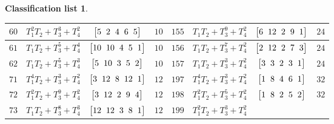 \documentclass[10pt,a4paper]{amsart}
\theoremstyle{definition}
\newtheorem{class-list}[thm]{Classification list}
\numberwithin{equation}{section}
\begin{document}
\begin{class-list}
\begin{table}[t!]
\begin{tabu}{c|c|c|c||c|c|c|c}
\\
\hline
${60}$&${T_{1}^{2}T_{2}+T_{3}^{3}+T_{4}^{2}}$
&$\arraycolsep=1mm\begin{bmatrix}{5} & {2} & {4} & {6} & {5}\end{bmatrix}$&${10}$
&${155}$&${T_{1}T_{2}+T_{3}^{9}+T_{4}^{2}}$
&$\arraycolsep=1mm\begin{bmatrix}{6} & {12} & {2} & {9} & {1}\end{bmatrix}$&${24}$
\\
\hline
${61}$&${T_{1}T_{2}+T_{3}^{5}+T_{4}^{4}}$
&$\arraycolsep=1mm\begin{bmatrix}{10} & {10} & {4} & {5} & {1}\end{bmatrix}$&${10}$
&${156}$&${T_{1}T_{2}+T_{3}^{7}+T_{4}^{2}}$
&$\arraycolsep=1mm\begin{bmatrix}{2} & {12} & {2} & {7} & {3}\end{bmatrix}$&${24}$
\\
\hline
${62}$&${T_{1}T_{2}+T_{3}^{5}+T_{4}^{3}}$
&$\arraycolsep=1mm\begin{bmatrix}{5} & {10} & {3} & {5} & {2}\end{bmatrix}$&${10}$
&${157}$&${T_{1}T_{2}+T_{3}^{3}+T_{4}^{2}}$
&$\arraycolsep=1mm\begin{bmatrix}{3} & {3} & {2} & {3} & {1}\end{bmatrix}$&${24}$
\\
\hline
${71}$&${T_{1}^{4}T_{2}+T_{3}^{3}+T_{4}^{2}}$
&$\arraycolsep=1mm\begin{bmatrix}{3} & {12} & {8} & {12} & {1}\end{bmatrix}$&${12}$
&${197}$&${T_{1}^{4}T_{2}+T_{3}^{3}+T_{4}^{2}}$
&$\arraycolsep=1mm\begin{bmatrix}{1} & {8} & {4} & {6} & {1}\end{bmatrix}$&${32}$
\\
\hline
${72}$&${T_{1}^{2}T_{2}+T_{3}^{9}+T_{4}^{2}}$
&$\arraycolsep=1mm\begin{bmatrix}{3} & {12} & {2} & {9} & {4}\end{bmatrix}$&${12}$
&${198}$&${T_{1}^{2}T_{2}+T_{3}^{5}+T_{4}^{2}}$
&$\arraycolsep=1mm\begin{bmatrix}{1} & {8} & {2} & {5} & {2}\end{bmatrix}$&${32}$
\\
\hline
${73}$&${T_{1}T_{2}+T_{3}^{8}+T_{4}^{3}}$
&$\arraycolsep=1mm\begin{bmatrix}{12} & {12} & {3} & {8} & {1}\end{bmatrix}$&${12}$
&${199}$&${T_{1}^{2}T_{2}+T_{3}^{3}+T_{4}^{2}}$

\end{tabu}
\end{table}
\end{class-list}
\end{document}
